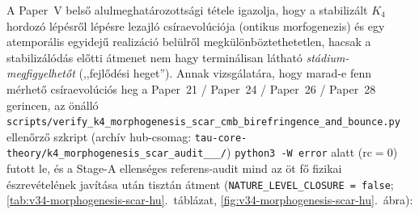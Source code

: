 \documentclass[11pt,a4paper]{article}
\begin{document}
A Paper~V belső alulmeghatározottsági tétele igazolja, hogy a stabilizált $K_4$ hordozó lépésről lépésre lezajló csíraevolúciója (ontikus morfogenezis) és egy atemporális egyidejű realizáció belülről megkülönböztethetetlen, hacsak a stabilizálódás előtti átmenet nem hagy terminálisan látható \emph{stádium-megfigyelhetőt} (,,fejlődési heget''). Annak vizsgálatára, hogy marad-e fenn mérhető csíraevolúciós heg a Paper~21 / Paper~24 / Paper~26 / Paper~28 gerincen, az önálló \texttt{scripts/\allowbreak verify\_\allowbreak k4\_\allowbreak morphogenesis\_\allowbreak scar\_\allowbreak cmb\_\allowbreak birefringence\_\allowbreak and\_\allowbreak bounce.py} ellenőrző szkript (archív hub-csomag: \texttt{tau-core-theory/\allowbreak k4\_\allowbreak morphogenesis\_\allowbreak scar\_\allowbreak audit\_\_\_/}) \texttt{python3 -W error} alatt ($\mathrm{rc}=0$) futott le, és a Stage-A ellenséges referens-audit mind az öt fő fizikai észrevételének javítása után tisztán átment (\texttt{NATURE\_\allowbreak LEVEL\_\allowbreak CLOSURE = false}; \ref{tab:v34-morphogenesis-scar-hu}.~táblázat, \ref{fig:v34-morphogenesis-scar-hu}.~ábra):
\end{document}

